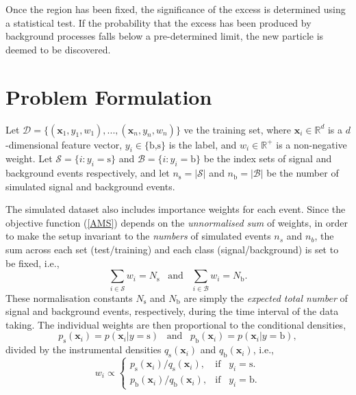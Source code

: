 \documentclass[]{article}
\begin{document}
Once the region has been fixed, the significance of the excess is determined using a statistical test. If the probability that the excess has been produced by background processes falls below a pre-determined limit, the new particle is deemed to be discovered.




\section{Problem Formulation}

Let $\mathcal{D} = \{(\bm{x}_1, y_1,w_1),...,(\bm{x}_n,y_n,w_n)\}$ ve the training set, where $\bm{x}_i \in \mathbb{R}^d$ is a $d$-dimensional feature vector, $y_i \in \{\text{b,s}\}$ is the label, and $w_i \in \mathbb{R}^+$ is a non-negative weight. Let $\mathcal{S} = \{i : y_i = \text{s}\}$ and $\mathcal{B} = \{i : y_i = \text{b}\}$ be the index sets of signal and background events respectively, and let $n_\text{s} = |\mathcal{S}|$ and $n_\text{b} = |\mathcal{B}|$ be the number of simulated signal and background events. 

The simulated dataset also includes importance weights for each event. Since the objective function (\ref{AMS}) depends on the \textit{unnormalised sum} of weights, in order to make the setup invariant to the \textit{numbers} of simulated events $n_s$ and $n_b$, the sum across each set (test/training) and each class (signal/background) is set to be fixed, i.e.,
\begin{equation}
	\sum_{i \in \mathcal{S}} w_i = N_\text{s} \hspace{10pt} \text{and} \hspace{10pt} \sum_{i \in \mathcal{B}} w_i = N_\text{b}.
\end{equation}
These normalisation constants $N_\text{s}$ and $N_\text{b}$ are simply the \textit{expected total number} of signal and background events, respectively, during the time interval of the data taking. The individual weights are then proportional to the conditional densities,
$$ p_\text{s}(\bm{x}_i) = p(\bm{x}_i|y=\text{s}) \hspace{10pt} \text{and} \hspace{10pt} p_\text{b}(\bm{x}_i) = p(\bm{x}_i|y=\text{b}), $$
divided by the instrumental densities $q_\text{s}(\bm{x}_i)$ and $q_\text{b}(\bm{x}_i)$, i.e.,
\begin{equation}
	w_i \propto \begin{cases}
	p_\text{s}(\bm{x}_i)/ q_\text{s}(\bm{x}_i), & \text{if} \hspace{10pt} y_i= \text{s}. \\
	p_\text{b}(\bm{x}_i) / q_\text{b}(\bm{x}_i), & \text{if} \hspace{10pt} y_i= \text{b}.
	\end{cases}
\end{equation}
\end{document}
